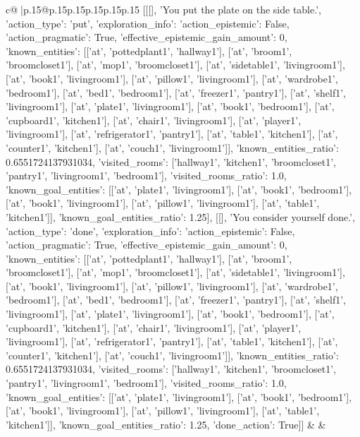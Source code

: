 \documentclass{article}
\begin{document}
{\begin{supertabular}{c@{$\;$}|p{.15\linewidth}@{}p{.15\linewidth}p{.15\linewidth}p{.15\linewidth}p{.15\linewidth}p{.15\linewidth}}
{{{	 [[[], 'You put the plate on the side table.', {'action_type': 'put', 'exploration_info': {'action_epistemic': False, 'action_pragmatic': True, 'effective_epistemic_gain_amount': 0, 'known_entities': [['at', 'pottedplant1', 'hallway1'], ['at', 'broom1', 'broomcloset1'], ['at', 'mop1', 'broomcloset1'], ['at', 'sidetable1', 'livingroom1'], ['at', 'book1', 'livingroom1'], ['at', 'pillow1', 'livingroom1'], ['at', 'wardrobe1', 'bedroom1'], ['at', 'bed1', 'bedroom1'], ['at', 'freezer1', 'pantry1'], ['at', 'shelf1', 'livingroom1'], ['at', 'plate1', 'livingroom1'], ['at', 'book1', 'bedroom1'], ['at', 'cupboard1', 'kitchen1'], ['at', 'chair1', 'livingroom1'], ['at', 'player1', 'livingroom1'], ['at', 'refrigerator1', 'pantry1'], ['at', 'table1', 'kitchen1'], ['at', 'counter1', 'kitchen1'], ['at', 'couch1', 'livingroom1']], 'known_entities_ratio': 0.6551724137931034, 'visited_rooms': ['hallway1', 'kitchen1', 'broomcloset1', 'pantry1', 'livingroom1', 'bedroom1'], 'visited_rooms_ratio': 1.0, 'known_goal_entities': [['at', 'plate1', 'livingroom1'], ['at', 'book1', 'bedroom1'], ['at', 'book1', 'livingroom1'], ['at', 'pillow1', 'livingroom1'], ['at', 'table1', 'kitchen1']], 'known_goal_entities_ratio': 1.25}}], [[], 'You consider yourself done.', {'action_type': 'done', 'exploration_info': {'action_epistemic': False, 'action_pragmatic': True, 'effective_epistemic_gain_amount': 0, 'known_entities': [['at', 'pottedplant1', 'hallway1'], ['at', 'broom1', 'broomcloset1'], ['at', 'mop1', 'broomcloset1'], ['at', 'sidetable1', 'livingroom1'], ['at', 'book1', 'livingroom1'], ['at', 'pillow1', 'livingroom1'], ['at', 'wardrobe1', 'bedroom1'], ['at', 'bed1', 'bedroom1'], ['at', 'freezer1', 'pantry1'], ['at', 'shelf1', 'livingroom1'], ['at', 'plate1', 'livingroom1'], ['at', 'book1', 'bedroom1'], ['at', 'cupboard1', 'kitchen1'], ['at', 'chair1', 'livingroom1'], ['at', 'player1', 'livingroom1'], ['at', 'refrigerator1', 'pantry1'], ['at', 'table1', 'kitchen1'], ['at', 'counter1', 'kitchen1'], ['at', 'couch1', 'livingroom1']], 'known_entities_ratio': 0.6551724137931034, 'visited_rooms': ['hallway1', 'kitchen1', 'broomcloset1', 'pantry1', 'livingroom1', 'bedroom1'], 'visited_rooms_ratio': 1.0, 'known_goal_entities': [['at', 'plate1', 'livingroom1'], ['at', 'book1', 'bedroom1'], ['at', 'book1', 'livingroom1'], ['at', 'pillow1', 'livingroom1'], ['at', 'table1', 'kitchen1']], 'known_goal_entities_ratio': 1.25}, 'done_action': True}]] 
	  } 
	   } 
	   } 
	 & & \\ 
 

    \theutterance {}  


\end{supertabular}}
\end{document}
